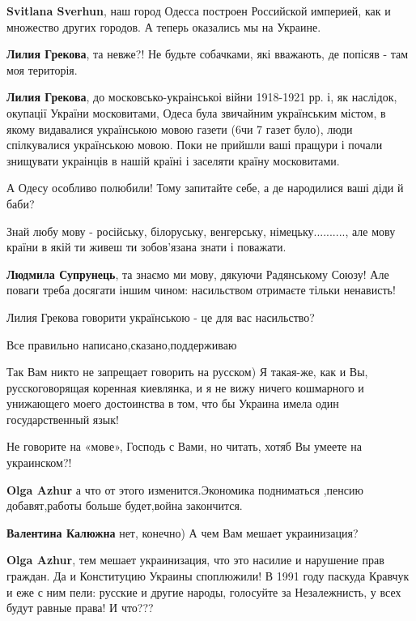\begin{itemize}
{\begin{itemize}
\textbf{Svitlana Sverhun}, наш город Одесса построен Российской империей, как и множество других городов. А теперь оказались мы на Украине.

\textbf{Лилия Грекова}, та невже?! Не будьте собачками, які вважають, де попісяв - там моя територія.

\textbf{Лилия Грекова}, до московсько-украінськоі війни 1918-1921 рр. і, як
наслідок, окупації України московитами, Одеса була звичайним українським
містом, в якому видавалися українською мовою газети (6чи 7 газет було), люди
спілкувалися українською мовою. Поки не прийшли ваші пращури і почали знищувати
украінців в нашій країні і заселяти країну московитами.

А Одесу особливо полюбили! Тому запитайте себе, а де народилися ваші діди й
баби?

\end{itemize}

Знай любу мову - російську, білоруську, венгерську, німецьку.........., але
мову країни в якій ти живеш ти зобов'язана знати і поважати.

\begin{itemize}
\textbf{Людмила Супрунець}, та знаємо ми мову, дякуючи Радянському Союзу! Але поваги треба досягати іншим чином: насильством отримаєте тільки ненависть!

Лилия Грекова говорити українською - це для вас насильство?
\end{itemize}

Все правильно написано,сказано,поддерживаю


Так Вам никто не запрещает говорить на русском) Я такая-же, как и Вы,
русскоговорящая коренная киевлянка, и я не вижу ничего кошмарного и унижающего
моего достоинства в том, что бы Украина имела один государственный язык!

Не говорите на «мове», Господь с Вами, но читать, хотяб Вы умеете на украинском?!

\textbf{Olga Azhur} а что от этого изменится.Экономика подниматься ,пенсию добавят,работы больше будет,война закончится.

\textbf{Валентина Калюжна} нет, конечно) А чем Вам мешает украинизация?

\textbf{Olga Azhur}, тем мешает украинизация, что это насилие и нарушение прав
граждан. Да и Конституцию Украины споплюжили! В 1991 году паскуда Кравчук и еже
с ним пели: русские и другие народы, голосуйте за Незалежнисть, у всех будут
равные права! И что???

}
\end{itemize}
